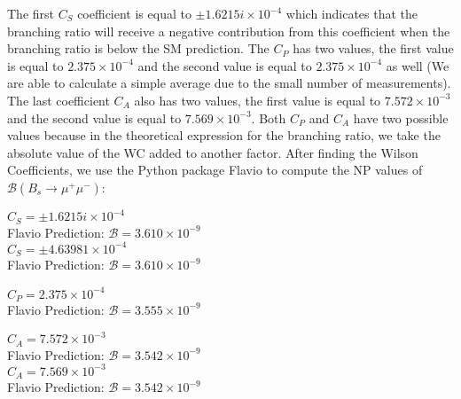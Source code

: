 \documentclass[12pt]{article}
\begin{document}
The first $C_S$ coefficient is equal to $\pm 1.6215i \times 10^{-4}$ which indicates that the branching ratio will receive a negative contribution from this coefficient when the branching ratio is below the SM prediction. The $C_P$ has two values, the first value is equal to $2.375\times 10^{-4}$ and the second value is equal to $2.375 \times 10^{-4}$ as well (We are able to calculate a simple average due to the small number of measurements). The last coefficient $C_{A}$ also has two values, the first value is equal to $7.572 \times 10^{-3}$ and the second value is equal to $7.569 \times 10^{-3}$. Both $C_P$ and $C_A$ have two possible values because in the theoretical expression for the branching ratio, we take the absolute value of the WC added to another factor. After finding the Wilson Coefficients, we use the Python package Flavio \cite{flavio} to compute the NP values of $\mathcal{B}(B_s\rightarrow \mu^+\mu^-)$:
\begin{center}
 $C_S = \pm 1.6215i \times 10^{-4}$\\
 Flavio Prediction: $\mathcal{B} = 3.610 \times 10^{-9}$\\
 $C_S = \pm 4.63981 \times 10^{-4}$\\
 Flavio Prediction: $\mathcal{B} = 3.610 \times 10^{-9}$\\
\end{center}
\begin{center}
$C_{P} = 2.375 \times 10^{-4}$ \\
Flavio Prediction: $\mathcal{B} = 3.555 \times 10^{-9}$\\
\end{center}
\begin{center}
$C_{A} = 7.572 \times 10^{-3}$ \\
Flavio Prediction: $\mathcal{B} = 3.542 \times 10^{-9}$\\
$C_{A} = 7.569\times 10^{-3}$ \\
Flavio Prediction: $\mathcal{B} = 3.542 \times 10^{-9}$\\
\end{center}
\end{document}
